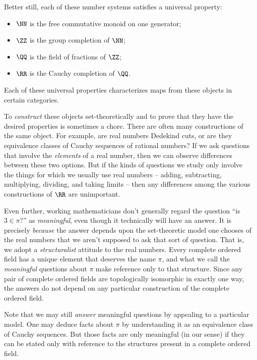 Better still, each of these number systems satisfies a universal property:
\begin{itemize}
  \item $\NN$ is the free commutative monoid on one generator;
  \item $\ZZ$ is the group completion of $\NN$;
  \item $\QQ$ is the field of fractions of $\ZZ$;
  \item $\RR$ is the Cauchy completion of $\QQ$.
\end{itemize}
Each of these universal properties characterizes maps from these objects in certain categories.

To \emph{construct} these objects set-theoretically and to prove that they have the desired properties is sometimes a chore.
There are often many constructions of the same object.
For example, are real numbers Dedekind cuts, or are they equivalence classes of Cauchy sequences of rational numbers?
If we ask questions that involve the \emph{elements} of a real number, then we can observe differences between these two options. 
But if the kinds of questions we study only involve the things for which we usually use real numbers -- adding, subtracting, multiplying, dividing, and taking limits -- then any differences among the various constructions of $\RR$ are unimportant.

Even further, working mathematicians don't generally regard the question \enquote{is $3 \in \pi$?} as \emph{meaningful}, even though it technically will have an answer.
It is precisely \emph{because} the answer depends upon the set-theoretic model one chooses of the real numbers that we aren't supposed to ask that sort of question.
That is, we adopt a \emph{structuralist} attitude to the real numbers.
Every complete ordered field has a unique element that deserves the name $\pi$, and
what we call the \emph{meaningful} questions about $\pi$ make reference only to that structure.
Since any pair of complete ordered fields are topologically isomorphic in exactly one way, the answers do not depend on any particular construction of the complete ordered field.

Note that we may still \emph{answer} meaningful questions by appealing to a particular model.
One may deduce facts about $\pi$ by understanding it as an equivalence class of Cauchy sequences.
But those facts are only meaningful (in our sense) if they can be stated only with reference to the structures present in a complete ordered field.

